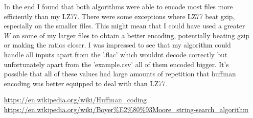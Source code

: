 \documentclass[a4paper, 10pt]{article}
\begin{document}
In the end I found that both algorithms were able to encode most files more efficiently than my LZ77. There were some exceptions where LZ77 beat gzip, especially on the smaller files. This might mean that I could have used a greater $W$ on some of my larger files to obtain a better encoding, potentially beating gzip or making the ratios closer. I was impressed to see that my algorithm could handle all inputs apart from the '.flac' which wouldnt decode correctly but unfortunately apart from the 'example.csv' all of them encoded bigger. It's possible that all of these values had large amounts of repetition that huffman encoding was better equipped to deal with than LZ77.

\begin{thebibliography}{1}
  \url{https://en.wikipedia.org/wiki/Huffman_coding}
  \url{https://en.wikipedia.org/wiki/Boyer\%E2\%80\%93Moore_string-search_algorithm}
\end{thebibliography}
\end{document}
